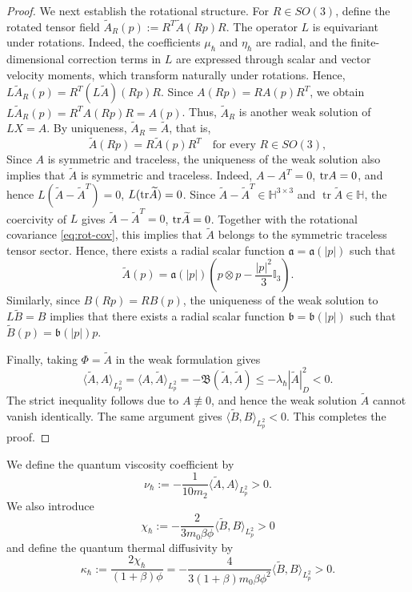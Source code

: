 \documentclass[10pt,reqno]{amsart}
\numberwithin{equation}{section}
\newcommand{\lt}{\left}
\newcommand{\rt}{\right}
\newcommand{\lal}{\langle}
\newcommand{\ral}{\rangle}
\newcommand{\bq}{\begin{equation}}
\newcommand{\eq}{\end{equation}}
\newcommand{\tr}{{\rm tr}}
\begin{document}
\begin{proof}
 
We next establish the rotational structure. For $R\in SO(3)$, define the rotated tensor field $\widetilde A_R(p):=R^T\widetilde A(Rp)R$. The operator $L$ is equivariant under rotations. Indeed, the coefficients $\mu_\hbar$ and $\eta_\hbar$ are radial, and the finite-dimensional correction terms in $L$ are expressed through scalar and vector velocity moments, which transform naturally under rotations. Hence, $L\widetilde A_R(p)=R^T(L\widetilde A)(Rp)R$. Since $A(Rp)=R A(p)R^T$, we obtain $L\widetilde A_R(p)=R^T A(Rp)R=A(p)$. Thus, $\widetilde A_R$ is another weak solution of $LX=A$. By uniqueness, $\widetilde A_R=\widetilde A$, that is, 
\bq\label{eq:rot-cov}
\widetilde A(Rp)=R\widetilde A(p)R^T \quad \text{for every } R\in SO(3),
\eq
Since $A$ is symmetric and traceless, the uniqueness of the weak solution also implies that $\widetilde A$ is symmetric and traceless. Indeed, $A-A^T=0$, $\tr A=0$, and hence $L(\widetilde A-\widetilde A^T)=0$, $L(\tr \widetilde A)=0$. Since $\widetilde A-\widetilde A^T\in\mathbb H^{3\times3}$ and $\operatorname{tr}\widetilde A\in\mathbb H$, the coercivity of $L$ gives $\widetilde A-\widetilde A^T=0$, $\tr \widetilde A=0$. Together with the rotational covariance \eqref{eq:rot-cov}, this implies that $\widetilde A$ belongs to the symmetric traceless tensor sector. Hence, there exists a radial scalar function $\mathfrak a=\mathfrak a(|p|)$ such that
\[
\widetilde A(p)=\mathfrak a(|p|)\lt( p\otimes p-\frac{|p|^2}{3}\mathbb I_3\rt).
\]
Similarly, since $B(Rp)=R B(p)$, the uniqueness of the weak solution to $L\widetilde B=B$ implies that there exists a radial scalar function $\mathfrak b=\mathfrak b(|p|)$ such that $\widetilde B(p)=\mathfrak b(|p|)p$.

Finally, taking $\Phi=\widetilde A$ in the weak formulation gives
\[
\lal \widetilde A,A\ral_{L^2_p} = \lal A,\widetilde A\ral_{L^2_p} = -\mathfrak{B}(\widetilde A,\widetilde A) \le -\lambda_\hbar|\widetilde A|_D^2<0.
\]
The strict inequality follows due to $A\not\equiv0$, and hence the weak solution $\widetilde A$ cannot vanish identically. The same argument gives $\lal \widetilde B,B\ral_{L^2_p}<0$. This completes the proof.
\end{proof}
 

   
 

We define the quantum viscosity coefficient by
\bq \label{eq:nu-h}
\nu_\hbar:=-\frac{1}{10m_2 }\lal\widetilde A ,A \ral_{L^2_p}>0.
\eq
We also introduce
\[
\chi_\hbar:=-\frac{2}{3m_0\beta\phi }\lal\widetilde B ,B \ral_{L^2_p}>0
\]
and define the quantum thermal diffusivity by
\[
\kappa_\hbar:=\frac{2\chi_\hbar}{(1+\beta )\phi }=-\frac{4}{3(1+\beta )m_0\beta\phi ^2}\lal\widetilde B ,B \ral_{L^2_p}>0.
\]
\end{document}
